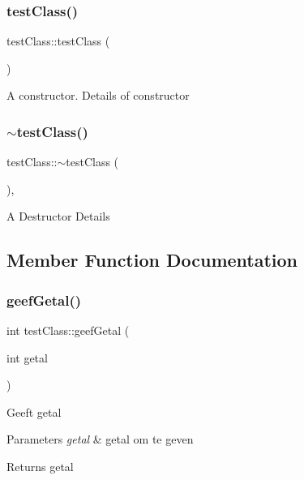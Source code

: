 \subsubsection{\texorpdfstring{test\+Class()}{testClass()}}
{\footnotesize\ttfamily test\+Class\+::test\+Class (\begin{DoxyParamCaption}{ }\end{DoxyParamCaption})\hspace{0.3cm}{\ttfamily [default]}}

A constructor. Details of constructor \mbox{\label{classtest_class_a7dd1f9f17dbebd79a82624a326161ffa}} 
\subsubsection{\texorpdfstring{$\sim$test\+Class()}{~testClass()}}
{\footnotesize\ttfamily test\+Class\+::$\sim$test\+Class (\begin{DoxyParamCaption}{ }\end{DoxyParamCaption})\hspace{0.3cm}{\ttfamily [virtual]}, {\ttfamily [default]}}

A Destructor Details 

\subsection{Member Function Documentation}
\mbox{\label{classtest_class_acd7ccefcfdbaf6aeccdddcc121f97f9d}} 
\subsubsection{\texorpdfstring{geef\+Getal()}{geefGetal()}}
{\footnotesize\ttfamily int test\+Class\+::geef\+Getal (\begin{DoxyParamCaption}\item[{int}]{getal }\end{DoxyParamCaption})}

Geeft getal 
\begin{DoxyParams}{Parameters}
{\em getal} & getal om te geven \\
\hline
\end{DoxyParams}
\begin{DoxyReturn}{Returns}
getal 
\end{DoxyReturn}
\mbox{\label{classtest_class_a4c40d71a857dfa40018d493b56c5a88f}} 
